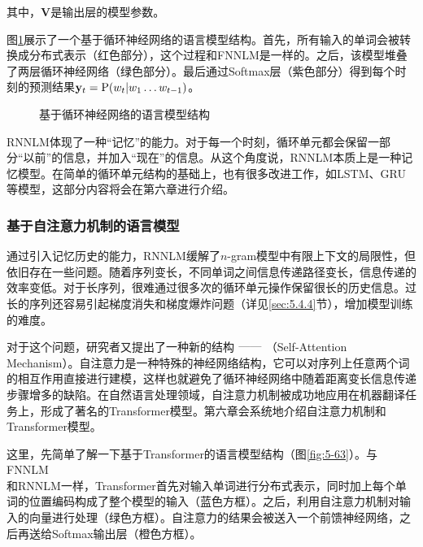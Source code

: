 \noindent  其中，$ \mathbf V $是输出层的模型参数。

\parinterval  图\ref{fig:5-62}展示了一个基于循环神经网络的语言模型结构。首先，所有输入的单词会被转换成分布式表示（红色部分），这个过程和FNNLM是一样的。之后，该模型堆叠了两层循环神经网络（绿色部分）。最后通过Softmax层（紫色部分）得到每个时刻的预测结果$ \mathbf y_t={\rm P}(w_t|w_1\dots w_{t-1}) $。

\begin{figure}[htp]
\centering

\caption{基于循环神经网络的语言模型结构}
\label{fig:5-62}
\end{figure}

\parinterval  RNNLM体现了一种``记忆''的能力。对于每一个时刻，循环单元都会保留一部分``以前''的信息，并加入``现在''的信息。从这个角度说，RNNLM本质上是一种记忆模型。在简单的循环单元结构的基础上，也有很多改进工作，如LSTM、GRU等模型，这部分内容将会在第六章进行介绍。


\subsubsection{基于自注意力机制的语言模型}

\parinterval  通过引入记忆历史的能力，RNNLM缓解了$n$-gram模型中有限上下文的局限性，但依旧存在一些问题。随着序列变长，不同单词之间信息传递路径变长，信息传递的效率变低。对于长序列，很难通过很多次的循环单元操作保留很长的历史信息。过长的序列还容易引起梯度消失和梯度爆炸问题（详见\ref{sec:5.4.4}节），增加模型训练的难度。

\parinterval  对于这个问题，研究者又提出了一种新的结构$\ \dash \ ${\small{}}（Self-Attention Mechanism）。自注意力是一种特殊的神经网络结构，它可以对序列上任意两个词的相互作用直接进行建模，这样也就避免了循环神经网络中随着距离变长信息传递步骤增多的缺陷。在自然语言处理领域，自注意力机制被成功地应用在机器翻译任务上，形成了著名的Transformer模型\cite{NIPS2017_7181}。第六章会系统地介绍自注意力机制和Transformer模型。

\parinterval  这里，先简单了解一下基于Transformer的语言模型结构（图\ref{fig:5-63}）。与FNNLM\\和RNNLM一样，Transformer首先对输入单词进行分布式表示，同时加上每个单词的位置编码构成了整个模型的输入（蓝色方框）。之后，利用自注意力机制对输入的向量进行处理（绿色方框）。自注意力的结果会被送入一个前馈神经网络，之后再送给Softmax输出层（橙色方框）。

